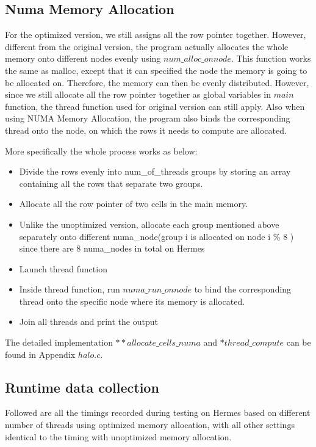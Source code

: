 \documentclass{cs4444}
\begin{document}
\subsection{Numa Memory Allocation}

		For the optimized version, we still assigns all the row pointer together. However, different from the original version, the program actually allocates the whole memory onto different nodes evenly using $num\_alloc\_onnode$. This function works the same as malloc, except that it can specified the node the memory is going to be allocated on. Therefore, the memory can then be evenly distributed. However, since we still allocate all the row pointer together as global variables in $main$ function, the thread function used for original version can still apply. Also when using NUMA Memory Allocation, the program also binds the corresponding thread onto the node, on which the rows it needs to compute are allocated. 
		
		More specifically the whole process works as below:
		\begin{itemize}
			\item Divide the rows evenly into num\_of\_threads groups by storing an array containing all the rows that separate two groups.
 
			\item Allocate all the row pointer of two cells in the main memory.
		
			\item Unlike the unoptimized version, allocate each group mentioned above separately onto different numa\_node(group i is allocated on node i \% 8 ) since there are 8 numa\_nodes in total on Hermes
			
			\item Launch thread function

			\item Inside thread function, run $numa\_run\_onnode$ to bind the corresponding thread onto the specific node where its memory is allocated.
			
			\item Join all threads and print the output
		\end{itemize}
		
		 The detailed implementation $**allocate\_cells\_numa$ and $*thread\_compute$ can be found in Appendix $halo.c$. 

\subsection{Runtime data collection}
	Followed are all the timings recorded during testing on Hermes based on different number of threads using optimized memory allocation, with all other settings identical to the timing with unoptimized memory allocation.
	
\end{document}
